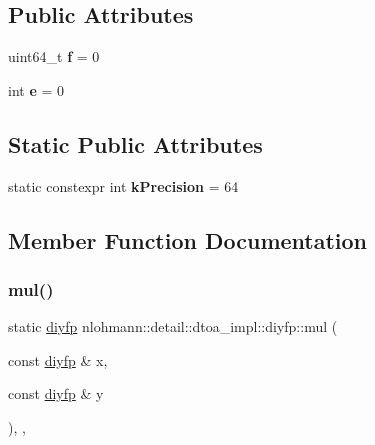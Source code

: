 \subsection*{Public Attributes}
\begin{DoxyCompactItemize}
\item 
\mbox{\label{structnlohmann_1_1detail_1_1dtoa__impl_1_1diyfp_a90f04c892ac1e707fdb50b0e1eb59030}} 
uint64\+\_\+t {\bfseries f} = 0
\item 
\mbox{\label{structnlohmann_1_1detail_1_1dtoa__impl_1_1diyfp_ae22e170815983961447c429f324c944d}} 
int {\bfseries e} = 0
\end{DoxyCompactItemize}
\subsection*{Static Public Attributes}
\begin{DoxyCompactItemize}
\item 
\mbox{\label{structnlohmann_1_1detail_1_1dtoa__impl_1_1diyfp_a03682754b06ed4f30b263119eecc2d52}} 
static constexpr int {\bfseries k\+Precision} = 64
\end{DoxyCompactItemize}


\subsection{Member Function Documentation}
\mbox{\label{structnlohmann_1_1detail_1_1dtoa__impl_1_1diyfp_aa5f250d12ce89c81fdb08900c6a823e8}} 
\subsubsection{\texorpdfstring{mul()}{mul()}}
{\footnotesize\ttfamily static \hyperlink{structnlohmann_1_1detail_1_1dtoa__impl_1_1diyfp}{diyfp} nlohmann\+::detail\+::dtoa\+\_\+impl\+::diyfp\+::mul (\begin{DoxyParamCaption}\item[{const \hyperlink{structnlohmann_1_1detail_1_1dtoa__impl_1_1diyfp}{diyfp} \&}]{x,  }\item[{const \hyperlink{structnlohmann_1_1detail_1_1dtoa__impl_1_1diyfp}{diyfp} \&}]{y }\end{DoxyParamCaption})\hspace{0.3cm}{\ttfamily [inline]}, {\ttfamily [static]}, {\ttfamily [noexcept]}}



